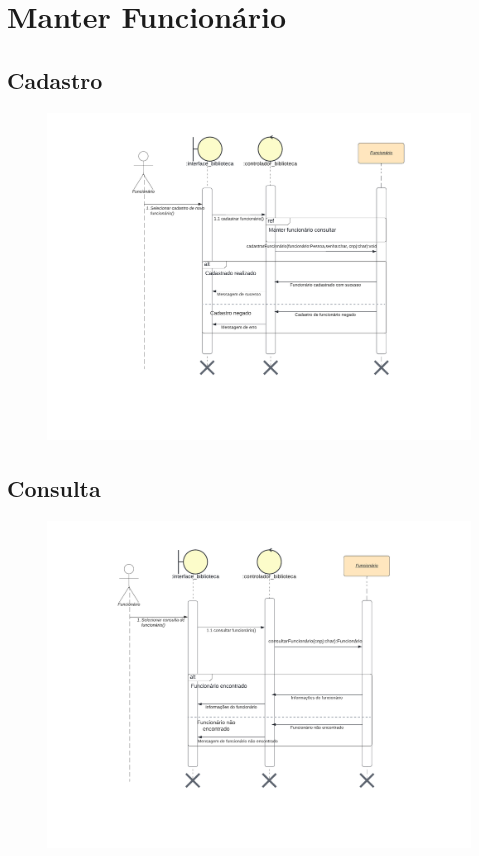 \newpage


\section{Manter Funcionário} 

\subsection{Cadastro}

\begin{figure}[h]
    \centering
    \includegraphics[width=1.0\linewidth]{Imagens/CadastrarFuncionário-sequência.pdf}
\end{figure}

\newpage

\subsection{Consulta}

\begin{figure}[h]
    \centering
    \includegraphics[width=1.0\linewidth]{Imagens/ConsultarFuncionário-sequência.pdf}
\end{figure}

